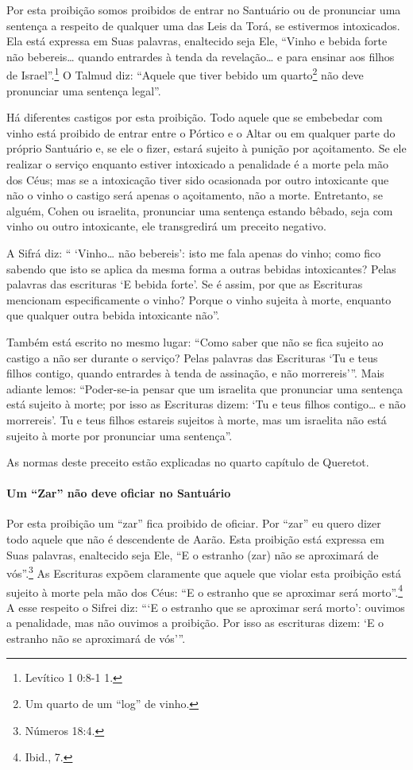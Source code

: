 Por esta proibição somos proibidos de entrar no Santuário ou de
pronunciar uma sentença a respeito de qualquer uma das Leis da Torá, se
estivermos intoxicados. Ela está expressa em Suas palavras, enaltecido
seja Ele, ``Vinho e bebida forte não bebereis\ldots{} quando entrardes à
tenda da revelação\ldots{} e para ensinar aos filhos de Israel''.\footnote{Levítico 1
0:8-1 1.} O Talmud diz: ``Aquele que tiver bebido um
quarto\footnote{Um quarto de um ``log'' de vinho.} não deve pronunciar uma sentença legal''.

Há diferentes castigos por esta proibição. Todo aquele que se embebedar
com vinho está proibido de entrar entre o Pórtico e o Altar ou em
qualquer parte do próprio Santuário e, se ele o fizer, estará sujeito à
punição por açoitamento. Se ele realizar o serviço enquanto estiver
intoxicado a penalidade é a morte pela mão dos Céus; mas se a
intoxicação tiver sido ocasionada por outro intoxicante que não o vinho
o castigo será apenas o açoitamento, não a morte. Entretanto, se alguém,
Cohen ou israelita, pronunciar uma sentença estando bêbado, seja
com vinho ou outro intoxicante, ele transgredirá um preceito negativo.

A Sifrá diz: `` `Vinho\ldots{} não bebereis': isto me fala apenas do vinho;
como fico sabendo que isto se aplica da mesma forma a outras bebidas
intoxicantes? Pelas palavras das escrituras `E bebida forte'. Se é
assim, por que as Escrituras mencionam especificamente o vinho? Porque
o vinho sujeita à morte, enquanto que qualquer outra bebida intoxicante
não''.

Também está escrito no mesmo lugar: ``Como saber que não se fica sujeito
ao castigo a não ser durante o serviço? Pelas palavras das Escrituras
`Tu e teus filhos contigo, quando entrardes à tenda de assinação, e não
morrereis'''. Mais adiante lemos: ``Poder-se-ia pensar que um israelita
que pronunciar uma sentença está sujeito à morte; por isso as Escrituras
dizem: `Tu e teus filhos contigo\ldots{} e não morrereis'. Tu e teus filhos
estareis sujeitos à morte, mas um israelita não está sujeito à morte
por pronunciar uma sentença''.

As normas deste preceito estão explicadas no quarto capítulo de Queretot.

\paragraph{Um ``Zar'' não deve oficiar no Santuário}

Por esta proibição um ``zar'' fica proibido de oficiar. Por ``zar'' eu
quero dizer todo aquele que não é descendente de Aarão. Esta proibição
está expressa em Suas palavras, enaltecido seja Ele, ``E o estranho
(zar) não se aproximará de vós''.\footnote{Números 18:4.} As Escrituras expõem claramente que
aquele que violar esta proibição está sujeito à morte pela mão dos Céus:
``E o estranho que se aproximar será morto''.\footnote{Ibid., 7.} A esse respeito
o Sifrei diz: ```E o estranho que se aproximar será morto': ouvimos a
penalidade, mas não ouvimos a proibição. Por isso as escrituras dizem:
`E o estranho não se aproximará de vós'''.

